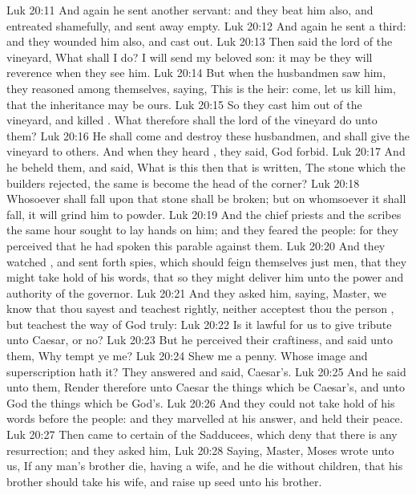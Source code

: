 \vs Luk 20:11 And again he sent another servant: and they beat him also, and entreated  shamefully, and sent  away empty.
\vs Luk 20:12 And again he sent a third: and they wounded him also, and cast  out.
\vs Luk 20:13 Then said the lord of the vineyard, What shall I do? I will send my beloved son: it may be they will reverence  when they see him.
\vs Luk 20:14 But when the husbandmen saw him, they reasoned among themselves, saying, This is the heir: come, let us kill him, that the inheritance may be ours.
\vs Luk 20:15 So they cast him out of the vineyard, and killed . What therefore shall the lord of the vineyard do unto them?
\vs Luk 20:16 He shall come and destroy these husbandmen, and shall give the vineyard to others. And when they heard , they said, God forbid.
\vs Luk 20:17 And he beheld them, and said, What is this then that is written, The stone which the builders rejected, the same is become the head of the corner?
\vs Luk 20:18 Whosoever shall fall upon that stone shall be broken; but on whomsoever it shall fall, it will grind him to powder.
\vs Luk 20:19 And the chief priests and the scribes the same hour sought to lay hands on him; and they feared the people: for they perceived that he had spoken this parable against them.
\vs Luk 20:20 And they watched , and sent forth spies, which should feign themselves just men, that they might take hold of his words, that so they might deliver him unto the power and authority of the governor.
\vs Luk 20:21 And they asked him, saying, Master, we know that thou sayest and teachest rightly, neither acceptest thou the person , but teachest the way of God truly:
\vs Luk 20:22 Is it lawful for us to give tribute unto Caesar, or no?
\vs Luk 20:23 But he perceived their craftiness, and said unto them, Why tempt ye me?
\vs Luk 20:24 Shew me a penny. Whose image and superscription hath it? They answered and said, Caesar's.
\vs Luk 20:25 And he said unto them, Render therefore unto Caesar the things which be Caesar's, and unto God the things which be God's.
\vs Luk 20:26 And they could not take hold of his words before the people: and they marvelled at his answer, and held their peace.
\vs Luk 20:27 Then came to  certain of the Sadducees, which deny that there is any resurrection; and they asked him,
\vs Luk 20:28 Saying, Master, Moses wrote unto us, If any man's brother die, having a wife, and he die without children, that his brother should take his wife, and raise up seed unto his brother.
